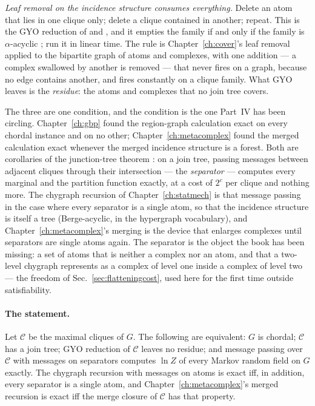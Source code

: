 \emph{Leaf removal on the incidence structure consumes everything.} Delete an
atom that lies in one clique only; delete a clique contained in another;
repeat. This is the GYO reduction of \citet{graham1979} and \citet{yu1979}, and
it empties the family if and only if the family is $\alpha$-acyclic
\citep{beeri1983}; \citet{tarjan1984} run it in linear time. The rule is
Chapter~\ref{ch:cover}'s leaf removal applied to the bipartite graph of atoms
and complexes, with one addition --- a complex swallowed by another is removed
--- that never fires on a graph, because no edge contains another, and fires
constantly on a clique family. What GYO leaves is the \emph{residue}: the
atoms and complexes that no join tree covers.

The three are one condition, and the condition is the one Part~IV has been
circling. Chapter~\ref{ch:gbp} found the region-graph calculation exact on
every chordal instance and on no other; Chapter~\ref{ch:metacomplex} found the
merged calculation exact whenever the merged incidence structure is a forest.
Both are corollaries of the junction-tree theorem \citep{lauritzen1988}: on a
join tree, passing messages between adjacent cliques through their
intersection --- the \emph{separator} --- computes every marginal and the
partition function exactly, at a cost of $2^{c}$ per clique and nothing more.
The chygraph recursion of Chapter~\ref{ch:statmech} is that message passing in
the case where every separator is a single atom, so that the incidence
structure is itself a tree (Berge-acyclic, in the hypergraph vocabulary), and
Chapter~\ref{ch:metacomplex}'s merging is the device that enlarges complexes
until separators are single atoms again. The separator is the object the book
has been missing: a set of atoms that is neither a complex nor an atom, and
that a two-level chygraph represents as a complex of level one inside a
complex of level two --- the freedom of Sec.~\ref{sec:flatteningcost}, used
here for the first time outside satisfiability.

\paragraph{The statement.} Let $\mathcal{C}$ be the maximal cliques of $G$.
The following are equivalent: $G$ is chordal; $\mathcal{C}$ has a join tree;
GYO reduction of $\mathcal{C}$ leaves no residue; and message passing over
$\mathcal{C}$ with messages on separators computes $\ln Z$ of every Markov
random field on $G$ exactly. The chygraph recursion with messages on atoms is
exact iff, in addition, every separator is a single atom, and
Chapter~\ref{ch:metacomplex}'s merged recursion is exact iff the merge closure
of $\mathcal{C}$ has that property.

